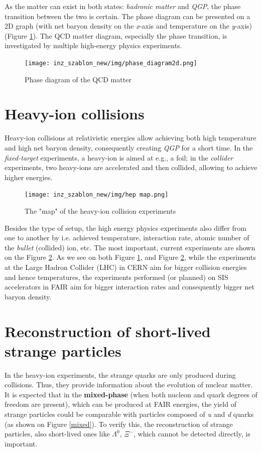  As the matter can exist in both states: \emph{hadronic matter} and \emph{QGP}, the phase transition between the two is certain. The phase diagram can be presented on a 2D graph (with net baryon density on the \emph{x}-axis and temperature on the \emph{y}-axis) (Figure \ref{phase 2d}). The QCD matter diagram, especially the phase transition, is investigated by multiple high-energy physics experiments.
 \begin{figure}[H]
 \centering
    \centering
    \texttt{[image: inz\_szablon\_new/img/phase\_diagram2d.png]}
    \caption{Phase diagram of the QCD matter  \cite{progress report}}
    \label{phase 2d}
    \vspace{0.3cm}
\end{figure}
\section{Heavy-ion collisions}
Heavy-ion collisions at relativistic energies allow achieving both high temperature and high net baryon density, consequently  creating \emph{QGP} for a short time. In the \emph{fixed-target} experiments, a heavy-ion is aimed at e.g., a foil; in the \emph{collider} experiments, two heavy-ions are accelerated and then collided, allowing to achieve higher energies.

\begin{figure}[H]
    \centering
    \texttt{[image: inz\_szablon\_new/img/hep map.png]}
    \caption{The "map" of the heavy-ion collision experiments \cite{hep map}}
    \label{hep experiments}
 \end{figure}

Besides the type of setup, the high energy physics experiments also differ from one to another by i.e. achieved temperature, interaction rate, atomic number of the \emph{bullet} (collided) ion, etc. The most important, current experiments are shown on the Figure \ref{hep experiments}. As we see on both Figure \ref{phase 2d}, and Figure \ref{hep experiments}, while the experiments at the Large Hadron Collider (LHC) in CERN aim for bigger collision energies and hence temperatures\cite{alice}, the experiments performed (or planned) on SIS accelerators in FAIR aim for bigger interaction rates and consequently bigger net baryon density\cite{sis}.

\section{Reconstruction of short-lived strange particles}
In the heavy-ion experiments, the strange quarks are only produced during collisions. Thus, they provide information about the evolution of nuclear matter. It is expected\cite{deconfinement} that in the \textbf{mixed-phase} (when both nucleon and quark degrees of freedom are present), which can be produced at FAIR energies, the yield of strange particles could be comparable with particles composed of \emph{u} and \emph{d} quarks (as shown on Figure \ref{mixed}). To verify this, the reconstruction of strange particles, also short-lived ones  like \textit{$\Lambda^0$}, \textit{$\Xi^-$}, \PKzS which cannot be detected directly, is important.

